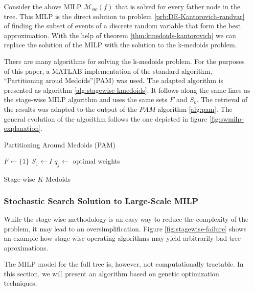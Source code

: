 Consider the above MILP $\mathcal{M}_{sw}(f)$ that is solved for every father node in the tree.
This MILP is the direct solution to problem \ref{prb:DE-Kantorovich-randvar} of finding the subset of events of a discrete random variable that form the best approximation.
With the help of theorem \ref{thm:kmedoids-kantorovich} we can replace the solution of the MILP with the solution to the k-medoids problem. 

There are many algorithms for solving the k-medoids problem.
For the purposes of this paper, a MATLAB implementation of the standard algorithm, ``Partitioning aroud Medoids''(PAM) was used.
The adapted algorithm is presented as algorithm \ref{alg:stagewise-kmedoids}.
It follows along the same lines as the stage-wise MILP algorithm and uses the same sets $F$ and $S_k$.
The retrieval of the results was adapted to the output of the $PAM$ algorithm \ref{alg:pam}.
The general evolution of the algorithm follows the one depicted in figure \ref{fig:swmilp-explanation}.
\begin{algorithm}
  \caption{Partitioning Around Medoids (PAM)}
  \label{alg:pam}
\end{algorithm}
\begin{algorithm}
  $F \leftarrow \{1\}$
  $S_1 \leftarrow I$
  $q_j\leftarrow $ optimal weights 
  \caption{Stage-wise $K$-Medoids}
  \label{alg:stagewise-kmedoids}
\end{algorithm}
\subsubsection{Stochastic Search Solution to Large-Scale MILP}
While the stage-wise methodology is an easy way to reduce the complexity of the problem, it may lead to an oversimplification. Figure \ref{fig:stagewise-failure} shows an example how stage-wise operating algorithms may yield arbitrarily bad tree aproximations. 

The MILP model for the full tree is, however, not computationally tractable.
In this section, we will present an algorithm based on genetic optimization techniques. 


